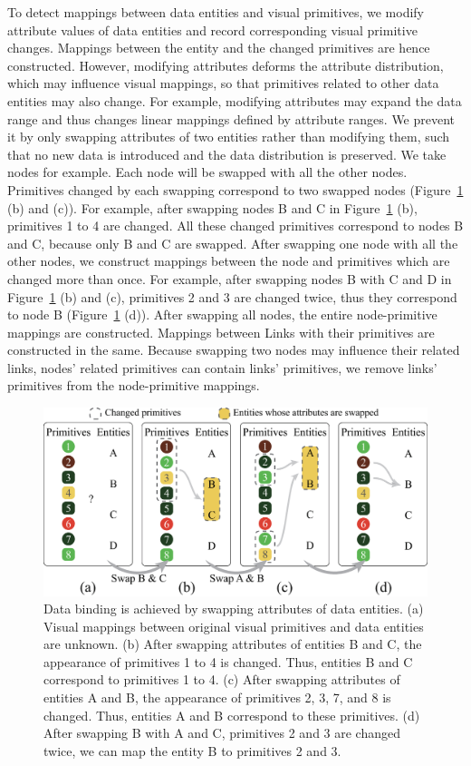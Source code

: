 To detect mappings between data entities and visual primitives, 
we modify attribute values of data entities and record corresponding visual primitive changes.
Mappings between the entity and the changed primitives are hence constructed.
However, modifying attributes deforms the attribute distribution, which may influence visual mappings, so that primitives related to other data entities may also change.
For example, modifying attributes may expand the data range and thus changes linear mappings defined by attribute ranges.
We prevent it by only swapping attributes of two entities rather than modifying them, such that no new data is introduced and the data distribution is preserved.
We take nodes for example.
Each node will be swapped with all the other nodes.
Primitives changed by each swapping correspond to two swapped nodes (Figure~\ref{fig:DataBinding} (b) and (c)).
For example, after swapping nodes B and C in Figure~\ref{fig:DataBinding} (b), primitives 1 to 4 are changed.
All these changed primitives correspond to nodes B and C, because only B and C are swapped.
After swapping one node with all the other nodes, we construct mappings between the node and primitives which are changed more than once.
For example, after swapping nodes B with C and D in Figure~\ref{fig:DataBinding} (b) and (c), primitives 2 and 3 are changed twice, thus they correspond to node B (Figure~\ref{fig:DataBinding} (d)).
After swapping all nodes, the entire node-primitive mappings are constructed.
Mappings between Links with their primitives are constructed in the same.
Because swapping two nodes may influence their related links, nodes' related primitives can contain links' primitives,
we remove links' primitives from the node-primitive mappings.


\begin{figure}
    \centering
    \includegraphics[width=1\columnwidth]{figures/DataBinding.eps}
    \caption{Data binding is achieved by swapping attributes of data entities. (a) Visual mappings between original visual primitives and data entities are unknown. (b) After swapping attributes of entities B and C, the appearance of primitives 1 to 4 is changed. Thus, entities B and C correspond to primitives 1 to 4. (c) After swapping attributes of entities A and B, the appearance of primitives 2, 3, 7, and 8 is changed. Thus, entities A and B correspond to these primitives. (d) After swapping B with A and C, primitives 2 and 3 are changed twice, we can map the entity B to primitives 2 and 3.}
    \label{fig:DataBinding}
\end{figure}


